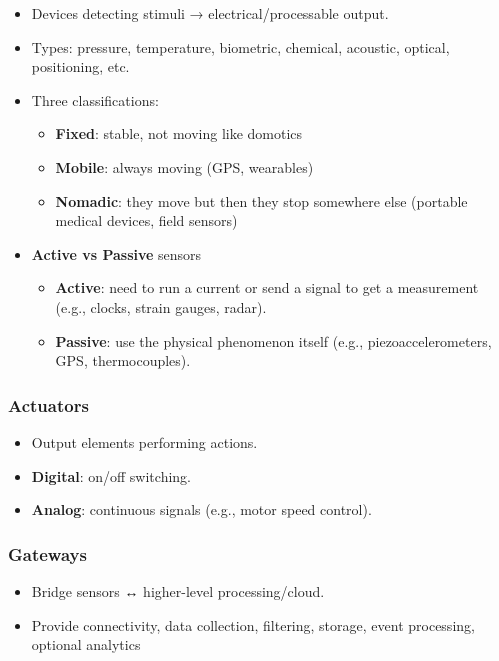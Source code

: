 \documentclass[
]{article}
\providecommand{\tightlist}{%
  \setlength{\itemsep}{0pt}\setlength{\parskip}{0pt}}
\begin{document}
\begin{itemize}
\tightlist
\item
  Devices detecting stimuli → electrical/processable output.
\item
  Types: pressure, temperature, biometric, chemical, acoustic, optical,
  positioning, etc.
\item
  Three classifications:

  \begin{itemize}
  \tightlist
  \item
    \textbf{Fixed}: stable, not moving like domotics
  \item
    \textbf{Mobile}: always moving (GPS, wearables)
  \item
    \textbf{Nomadic}: they move but then they stop somewhere else
    (portable medical devices, field sensors)
  \end{itemize}
\item
  \textbf{Active vs Passive} sensors

  \begin{itemize}
  \tightlist
  \item
    \textbf{Active}: need to run a current or send a signal to get a
    measurement (e.g., clocks, strain gauges, radar).
  \item
    \textbf{Passive}: use the physical phenomenon itself (e.g.,
    piezoaccelerometers, GPS, thermocouples).
  \end{itemize}
\end{itemize}

\subsubsection{Actuators}\label{actuators}

\begin{itemize}
\tightlist
\item
  Output elements performing actions.
\item
  \textbf{Digital}: on/off switching.
\item
  \textbf{Analog}: continuous signals (e.g., motor speed control).
\end{itemize}

\subsubsection{Gateways}\label{gateways}

\begin{itemize}
\tightlist
\item
  Bridge sensors ↔ higher-level processing/cloud.
\item
  Provide connectivity, data collection, filtering, storage, event
  processing, optional analytics
\end{itemize}
\end{document}
